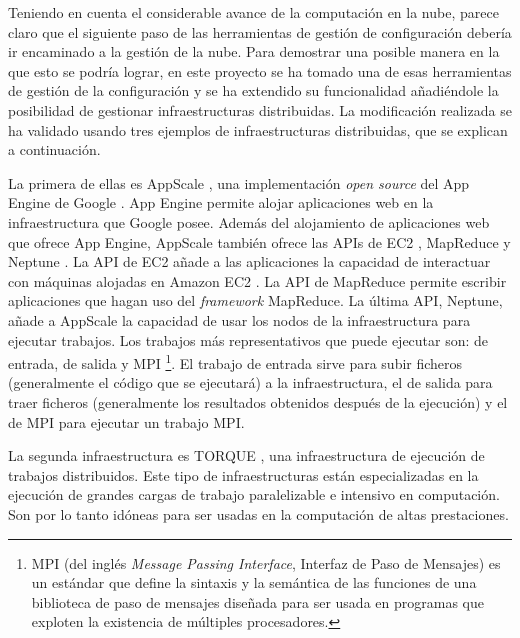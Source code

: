 Teniendo en cuenta el considerable avance de la computación en la nube, parece claro que el siguiente paso de las herramientas de gestión de configuración debería ir encaminado a la gestión de la nube. Para demostrar una posible manera en la que esto se podría lograr, en este proyecto se ha tomado una de esas herramientas de gestión de la configuración y se ha extendido su funcionalidad añadiéndole la posibilidad de gestionar infraestructuras distribuidas. La modificación realizada se ha validado usando tres ejemplos de infraestructuras distribuidas, que se explican a continuación.

La primera de ellas es AppScale \cite{appscale}, una implementación \emph{open source} del App Engine de Google \cite{appengine}. App Engine permite alojar aplicaciones web en la infraestructura que Google posee. Además del alojamiento de aplicaciones web que ofrece App Engine, AppScale también ofrece las APIs de EC2 \cite{appscale-ec2}, MapReduce \cite{appscale-mapreduce} y Neptune \cite{appscale-neptune}. La API de EC2 añade a las aplicaciones la capacidad de interactuar con máquinas alojadas en Amazon EC2 \cite{amazon-ec2}. La API de MapReduce permite escribir aplicaciones que hagan uso del \emph{framework} MapReduce. La última API, Neptune, añade a AppScale la capacidad de usar los nodos de la infraestructura para ejecutar trabajos. Los trabajos más representativos que puede ejecutar son: de entrada, de salida y MPI \footnote[1]{MPI (del inglés \emph{Message Passing Interface}, Interfaz de Paso de Mensajes) es un estándar que define la sintaxis y la semántica de las funciones de una biblioteca de paso de mensajes diseñada para ser usada en programas que exploten la existencia de múltiples procesadores.}. El trabajo de entrada sirve para subir ficheros (generalmente el código que se ejecutará) a la infraestructura, el de salida para traer ficheros (generalmente los resultados obtenidos después de la ejecución) y el de MPI para ejecutar un trabajo MPI.

La segunda infraestructura es TORQUE \cite{Staples:2006:TRM:1188455.1188464, torque}, una infraestructura de ejecución de trabajos distribuidos. Este tipo de infraestructuras están especializadas en la ejecución de grandes cargas de trabajo paralelizable e intensivo en computación. Son por lo tanto idóneas para ser usadas en la computación de altas prestaciones.

